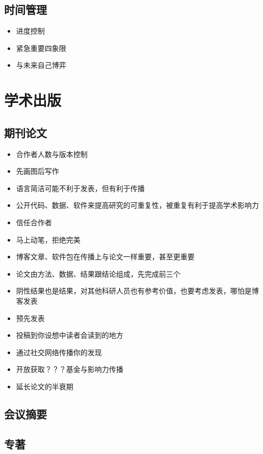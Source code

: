 \documentclass[]{book}
\providecommand{\tightlist}{%
  \setlength{\itemsep}{0pt}\setlength{\parskip}{0pt}}
\begin{document}
\subsection{时间管理}

\begin{itemize}
\tightlist
\item
  进度控制
\item
  紧急重要四象限
\item
  与未来自己博弈
\end{itemize}

\section{学术出版}

\subsection{期刊论文}

\begin{itemize}
\tightlist
\item
  合作者人数与版本控制
\item
  先画图后写作
\item
  语言简洁可能不利于发表，但有利于传播
\item
  公开代码、数据、软件来提高研究的可重复性，被重复有利于提高学术影响力
\item
  信任合作者
\item
  马上动笔，拒绝完美
\item
  博客文章、软件包在传播上与论文一样重要，甚至更重要
\item
  论文由方法、数据、结果跟结论组成，先完成前三个
\item
  阴性结果也是结果，对其他科研人员也有参考价值，也要考虑发表，哪怕是博客发表
\item
  预先发表
\item
  投稿到你设想中读者会读到的地方
\item
  通过社交网络传播你的发现
\item
  开放获取？？？基金与影响力传播
\item
  延长论文的半衰期
\end{itemize}

\subsection{会议摘要}

\subsection{专著}
\end{document}
